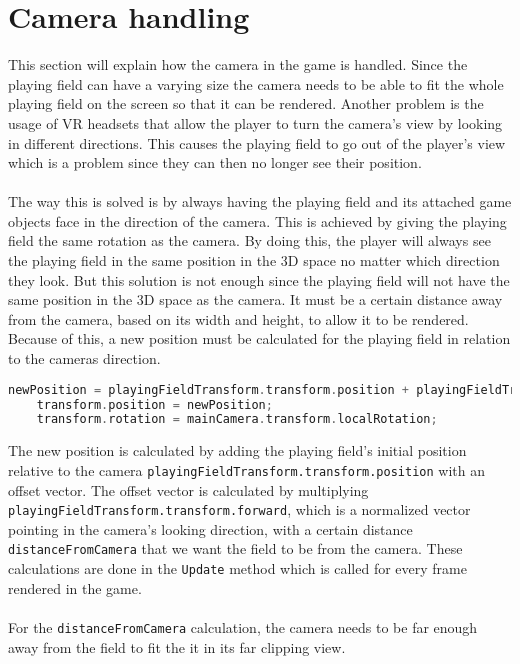 \section{Camera handling}
This section will explain how the camera in the game is handled.
Since the playing field can have a varying size the camera needs to be able to fit the whole playing field on the screen so that it can be rendered.
Another problem is the usage of VR headsets that allow the player to turn the camera's view by looking in different directions.
This causes the playing field to go out of the player's view which is a problem since they can then no longer see their position.
\\\\
The way this is solved is by always having the playing field and its attached game objects face in the direction of the camera.
This is achieved by giving the playing field the same rotation as the camera.
By doing this, the player will always see the playing field in the same position in the 3D space no matter which direction they look.
But this solution is not enough since the playing field will not have the same position in the 3D space as the camera.
It must be a certain distance away from the camera, based on its width and height, to allow it to be rendered. 
Because of this, a new position must be calculated for the playing field in relation to the cameras direction. 
\begin{lstlisting}[caption={Calculating and setting the position and rotation of the playing field}, captionpos=b,language=C,label={lst:camera_position}]
    newPosition = playingFieldTransform.transform.position + playingFieldTransform.transform.forward * distanceFromCamera;
    transform.position = newPosition;
    transform.rotation = mainCamera.transform.localRotation; 
\end{lstlisting}
The new position is calculated by adding the playing field's initial position relative to the camera \texttt{playingFieldTransform.transform.position} with an offset vector.
The offset vector is calculated by multiplying \texttt{playingFieldTransform.transform.forward}, which is a normalized vector pointing in the camera's looking direction, with a certain distance \texttt{distanceFromCamera} that we want the field to be from the camera.
These calculations are done in the \texttt{Update} method which is called for every frame rendered in the game.
\\\\
For the \texttt{distanceFromCamera} calculation, the camera needs to be far enough away from the field to fit the it in its far clipping view.
